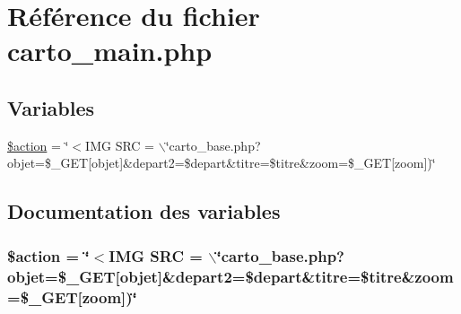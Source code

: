 \hypertarget{carto__main_8php}{
\section{R\'{e}f\'{e}rence du fichier carto\_\-main.php}
\label{carto__main_8php}
}
\subsection*{Variables}
\begin{CompactItemize}
\item 
\hyperlink{carto__main_8php_a0}{\$action} = \char`\"{}$<$IMG SRC = $\backslash$\char`\"{}carto\_\-base.php?objet=\$\_\-GET\mbox{[}objet\mbox{]}\&depart2=\$depart\&titre=\$titre\&zoom=\$\_\-GET\mbox{[}zoom\mbox{]})\char`\"{}
\end{CompactItemize}


\subsection{Documentation des variables}
\hypertarget{carto__main_8php_a0}{
\subsubsection[\$action]{\setlength{\rightskip}{0pt plus 5cm}\$action = \char`\"{}$<$IMG SRC = $\backslash$\char`\"{}carto\_\-base.php?objet=\$\_\-GET\mbox{[}objet\mbox{]}\&depart2=\$depart\&titre=\$titre\&zoom=\$\_\-GET\mbox{[}zoom\mbox{]})\char`\"{}}}
\label{carto__main_8php_a0}


